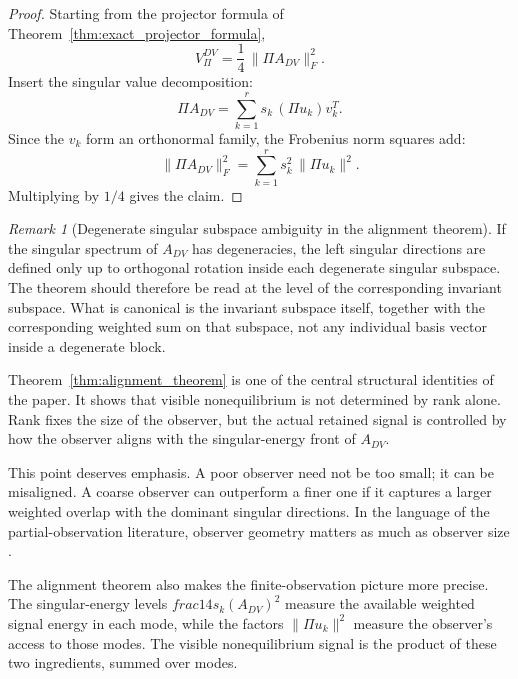 \documentclass[11pt,a4paper]{article}
\numberwithin{equation}{section}
\theoremstyle{thmcompact}
\theoremstyle{remark}
\newtheorem*{remarkplain}{Remark}
\newenvironment{remark}[1][]%
{\begin{remarkbox}\begin{remarkplain}[#1]\normalfont}
		{\end{remarkplain}\end{remarkbox}}
\begin{document}
\begin{proof}
Starting from the projector formula of Theorem~\ref{thm:exact_projector_formula},
\begin{equation}
V_\Pi^{DV}
=
\frac14\,\|\Pi A_{DV}\|_F^2.
\end{equation}
Insert the singular value decomposition:
\begin{equation}
\Pi A_{DV}
=
\sum_{k=1}^{r} s_k\,(\Pi u_k)v_k^T.
\end{equation}
Since the \(v_k\) form an orthonormal family, the Frobenius norm squares add:
\begin{equation}
\|\Pi A_{DV}\|_F^2
=
\sum_{k=1}^{r} s_k^2\,\|\Pi u_k\|^2.
\end{equation}
Multiplying by \(1/4\) gives the claim.
\end{proof}

\begin{remark}[Degenerate singular subspace ambiguity in the alignment theorem]
If the singular spectrum of \(A_{DV}\) has degeneracies, the left singular directions are defined only up to orthogonal rotation inside each degenerate singular subspace. The theorem should therefore be read at the level of the corresponding invariant subspace. What is canonical is the invariant subspace itself, together with the corresponding weighted sum on that subspace, not any individual basis vector inside a degenerate block.
\end{remark}

Theorem~\ref{thm:alignment_theorem} is one of the central structural identities of the paper. It shows that visible nonequilibrium is not determined by rank alone. Rank fixes the size of the observer, but the actual retained signal is controlled by how the observer aligns with the singular-energy front of \(A_{DV}\).

This point deserves emphasis. A poor observer need not be too small; it can be misaligned. A coarse observer can outperform a finer one if it captures a larger weighted overlap with the dominant singular directions. In the language of the partial-observation literature, observer geometry matters as much as observer size \cite{BlomSongVougaGodecMakarov2025,FritzErtelSeifert2024,Harunari2024,vanderMeerSaito2025,RoldanParrondo2012}.

The alignment theorem also makes the finite-observation picture more precise. The singular-energy levels \(	frac14 s_k(A_{DV})^2\) measure the available weighted signal energy in each mode, while the factors \(\|\Pi u_k\|^2\) measure the observer's access to those modes. The visible nonequilibrium signal is the product of these two ingredients, summed over modes.
\end{document}
